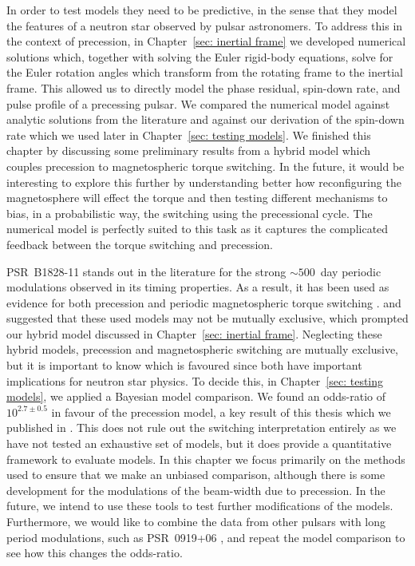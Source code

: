 \documentclass[twoside, 11pt]{thesis}
\begin{document}
In order to test models they need to be predictive, in the sense that they
model the features of a neutron star observed by pulsar astronomers. To address
this in the context of precession, in Chapter~\ref{sec: inertial frame} we
developed numerical solutions which, together with solving the Euler rigid-body
equations, solve for the Euler rotation angles which transform from the
rotating frame to the inertial frame. This allowed us to directly model the
phase residual, spin-down rate, and pulse profile of a precessing pulsar.
We compared the numerical model against analytic solutions from the literature
and against our derivation of the spin-down rate which we used later in
Chapter~\ref{sec: testing models}. We finished this chapter by discussing some
preliminary results from a hybrid model which couples precession to
magnetospheric torque switching. In the future, it would be interesting to explore
this further by understanding better how reconfiguring the magnetosphere will
effect the \citet{Deutsch1955} torque and then testing different mechanisms to
bias, in a probabilistic way, the switching using the precessional cycle. The
numerical model is perfectly suited to this task as it captures the complicated
feedback between the torque switching  and precession.

PSR~B1828-11 stands out in the literature for the strong $\sim 500$~day
periodic modulations observed in its timing properties. As a result, it has
been used as evidence for both precession \citep{Stairs2000} and periodic
magnetospheric torque switching \citep{Lyne2010}. \citet{Jones2012} and
\citet{Cordes2013} suggested that these used models may not be mutually exclusive,
which prompted our hybrid model discussed in Chapter~\ref{sec: inertial frame}.
Neglecting these hybrid models, precession and magnetospheric
switching are mutually exclusive, but it is important to know which is favoured
since both have important implications for neutron star physics. To decide
this, in Chapter~\ref{sec: testing models}, we applied a Bayesian model
comparison. We found an odds-ratio of $10^{2.7\pm 0.5}$ in favour of the
precession model, a key result of this thesis which we published in
\citet{Ashton2016}. This does not rule out the switching interpretation
entirely as we have not tested an exhaustive set of models, but it does provide
a quantitative framework to evaluate models. In this chapter  we focus
primarily on the methods used to ensure that we make an unbiased comparison, although
there is some development for the modulations of the beam-width due to
precession. In the future, we intend to use these tools to test further
modifications of the models. Furthermore, we would like to combine the data
from other pulsars with long period modulations, such as PSR~0919+06
\citep{Perera2015}, and repeat the model comparison to see how this changes the
odds-ratio.
\end{document}
